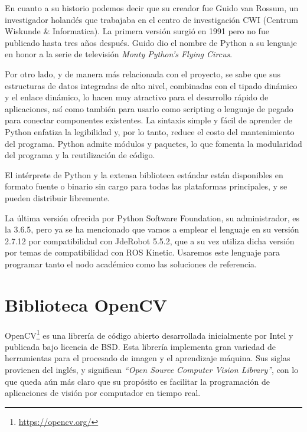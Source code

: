 En cuanto a su historio podemos decir que su creador fue Guido van Rossum, un investigador holandés que trabajaba en el centro de investigación CWI (Centrum Wiskunde \& Informatica). La primera versión surgió en 1991 pero no fue publicado hasta tres años después. Guido dio el nombre de Python a su lenguaje en honor a la serie de televisión \textit{Monty Python’s Flying Circus}.

Por otro lado, y de manera más relacionada con el proyecto, se sabe que sus estructuras de datos integradas de alto nivel, combinadas con el tipado dinámico y el enlace dinámico, lo hacen muy atractivo para el desarrollo rápido de aplicaciones, así como también para usarlo como scripting o lenguaje de pegado para conectar componentes existentes. La sintaxis simple y fácil de aprender de Python enfatiza la legibilidad y, por lo tanto, reduce el costo del mantenimiento del programa. Python admite módulos y paquetes, lo que fomenta la modularidad del programa y la reutilización de código. 

El intérprete de Python y la extensa biblioteca estándar están disponibles en formato fuente o binario sin cargo para todas las plataformas principales, y se pueden distribuir libremente.

La última versión ofrecida por Python Software Foundation, su administrador, es la 3.6.5, pero ya se ha mencionado que vamos a emplear el lenguaje en su versión 2.7.12 por compatibilidad con JdeRobot 5.5.2, que a su vez utiliza dicha versión por temas de compatibilidad con ROS Kinetic. Usaremos este lenguaje para programar tanto el nodo académico como las soluciones de referencia.

\section{Biblioteca OpenCV}
OpenCV\footnote{\url{https://opencv.org/}} es una librería de código abierto desarrollada inicialmente por Intel y publicada bajo licencia de BSD. Esta librería implementa gran variedad de herramientas para el procesado de imagen y el aprendizaje máquina. Sus siglas provienen del inglés, y significan \textit{“Open Source Computer Vision Library”}, con lo que queda aún más claro que su propósito es facilitar la programación de aplicaciones de visión por computador en tiempo real.

